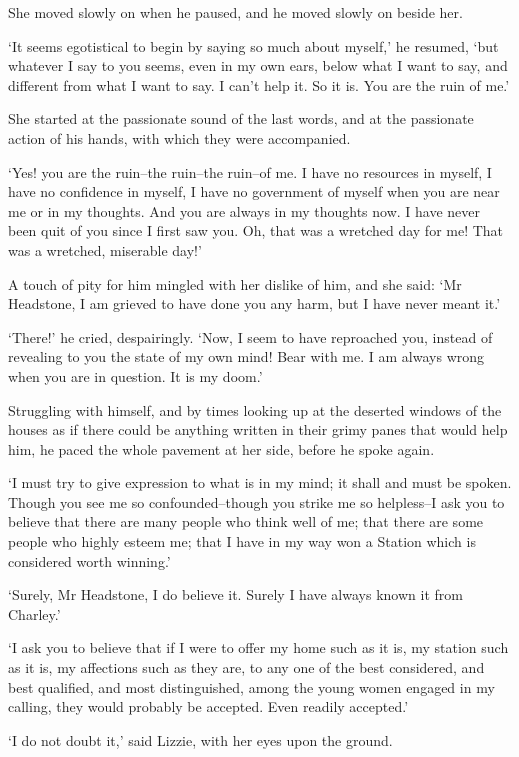 She moved slowly on when he paused, and he moved slowly on beside her.

‘It seems egotistical to begin by saying so much about myself,’ he
resumed, ‘but whatever I say to you seems, even in my own ears, below
what I want to say, and different from what I want to say. I can’t help
it. So it is. You are the ruin of me.’

She started at the passionate sound of the last words, and at the
passionate action of his hands, with which they were accompanied.

‘Yes! you are the ruin--the ruin--the ruin--of me. I have no resources
in myself, I have no confidence in myself, I have no government of
myself when you are near me or in my thoughts. And you are always in my
thoughts now. I have never been quit of you since I first saw you. Oh,
that was a wretched day for me! That was a wretched, miserable day!’

A touch of pity for him mingled with her dislike of him, and she said:
‘Mr Headstone, I am grieved to have done you any harm, but I have never
meant it.’

‘There!’ he cried, despairingly. ‘Now, I seem to have reproached you,
instead of revealing to you the state of my own mind! Bear with me. I am
always wrong when you are in question. It is my doom.’

Struggling with himself, and by times looking up at the deserted windows
of the houses as if there could be anything written in their grimy panes
that would help him, he paced the whole pavement at her side, before he
spoke again.

‘I must try to give expression to what is in my mind; it shall and must
be spoken. Though you see me so confounded--though you strike me so
helpless--I ask you to believe that there are many people who think well
of me; that there are some people who highly esteem me; that I have in
my way won a Station which is considered worth winning.’

‘Surely, Mr Headstone, I do believe it. Surely I have always known it
from Charley.’

‘I ask you to believe that if I were to offer my home such as it is, my
station such as it is, my affections such as they are, to any one of the
best considered, and best qualified, and most distinguished, among the
young women engaged in my calling, they would probably be accepted. Even
readily accepted.’

‘I do not doubt it,’ said Lizzie, with her eyes upon the ground.


